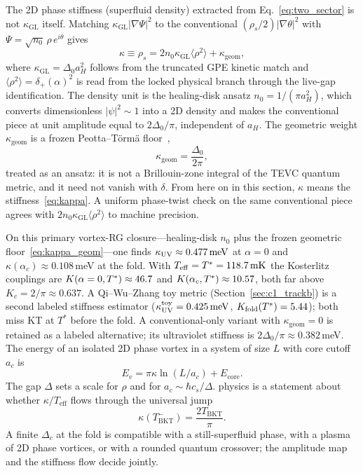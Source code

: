 The 2D phase stiffness (superfluid density) extracted from Eq.~\eqref{eq:two_sector} is not $\kappa_{\mathrm{GL}}$ itself. Matching $\kappa_{\mathrm{GL}}|\nabla\Psi|^2$ to the conventional $(\rho_s/2)|\nabla\theta|^2$ with $\Psi=\sqrt{n_0}\,\rho\,e^{i\theta}$ gives
\begin{equation}
\kappa\equiv\rho_s=2 n_0\kappa_{\mathrm{GL}}\langle\rho^2\rangle+\kappa_{\mathrm{geom}},
\label{eq:kappa}
\end{equation}
where $\kappa_{\mathrm{GL}}=\Delta_0 a_H^2$ follows from the truncated GPE kinetic match and $\langle\rho^2\rangle=\delta_+(\alpha)^2$ is read from the locked physical branch through the live-gap identification. The density unit is the healing-disk ansatz $n_0=1/(\pi a_H^2)$, which converts dimensionless $|\psi|^2\sim 1$ into a 2D density and makes the conventional piece at unit amplitude equal to $2\Delta_0/\pi$, independent of $a_H$. The geometric weight $\kappa_{\mathrm{geom}}$ is a frozen Peotta--T\"orm\"a floor~\cite{PeottaTorma2015},
\begin{equation}
\kappa_{\mathrm{geom}}=\frac{\Delta_0}{2\pi},
\label{eq:kappa_geom}
\end{equation}
treated as an ansatz: it is not a Brillouin-zone integral of the TEVC quantum metric, and it need not vanish with $\delta$. From here on in this section, $\kappa$ means the stiffness~\eqref{eq:kappa}. A uniform phase-twist check on the same conventional piece agrees with $2 n_0\kappa_{\mathrm{GL}}\langle\rho^2\rangle$ to machine precision.

On this primary vortex-RG closure---healing-disk $n_0$ plus the frozen geometric floor~\eqref{eq:kappa_geom}---one finds $\kappa_{\mathrm{UV}}\approx0.477\,\mathrm{meV}$ at $\alpha=0$ and $\kappa(\alpha_c)\approx 0.108$\,meV at the fold. With $T_{\mathrm{eff}}=T^*=118.7\,\mathrm{mK}$ the Kosterlitz couplings are $K(\alpha=0,T^*)\approx46.7$ and $K(\alpha_c,T^*)\approx10.57$, both far above $K_c=2/\pi\approx 0.637$. A Qi--Wu--Zhang toy metric (Section~\ref{sec:c1_trackb}) is a second labeled stiffness estimator ($\kappa_{\mathrm{UV}}^{\mathrm{toy}}=0.425\,\mathrm{meV}$, $K_{\mathrm{fold}}(T^*)=5.44$); both miss KT at $T^*$ before the fold. A conventional-only variant with $\kappa_{\mathrm{geom}}=0$ is retained as a labeled alternative; its ultraviolet stiffness is $2\Delta_0/\pi\approx 0.382$\,meV. The energy of an isolated 2D phase vortex in a system of size $L$ with core cutoff $a_c$ is
\begin{equation}
E_v=\pi\kappa\ln(L/a_c)+E_{\mathrm{core}}.
\label{eq:Ev}
\end{equation}
The gap $\Delta$ sets a scale for $\rho$ and for $a_c\sim\hbar c_s/\Delta$. \BKT{} physics is a statement about whether $\kappa/T_{\mathrm{eff}}$ flows through the universal jump
\begin{equation}
\kappa(T_{\mathrm{BKT}}^-)=\frac{2T_{\mathrm{BKT}}}{\pi}.
\label{eq:universal_jump}
\end{equation}
A finite $\Delta_c$ at the fold is compatible with a still-superfluid phase, with a plasma of 2D phase vortices, or with a rounded quantum crossover; the amplitude map and the stiffness flow decide jointly.

